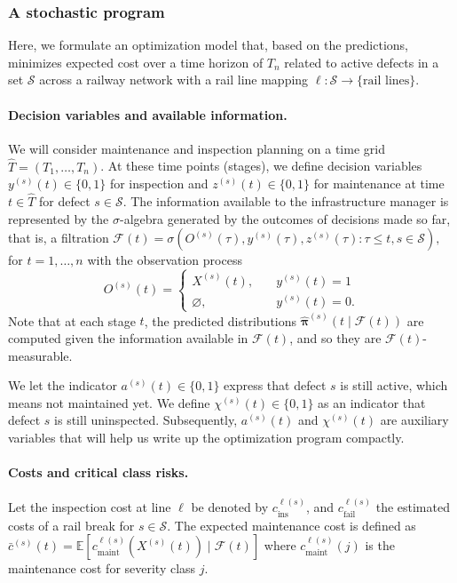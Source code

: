 \documentclass{article}
\begin{document}
\subsubsection{A stochastic program}
Here, we formulate an optimization model that, based on the predictions, minimizes expected cost over a time horizon of $T_n$ related to active defects in a set $\mathcal{S}$ across a railway network with a rail line mapping $\ell:\mathcal{S}\to\{\text{rail lines}\}$.


\paragraph{Decision variables and available information.}
We will consider maintenance and inspection planning on a time grid $\widehat T=(T_1,\dots,T_n)$.
At these time points (stages), we define decision variables 
$y^{(s)}(t)\in\{0,1\}$ for inspection and $z^{(s)}(t)\in\{0,1\}$ for maintenance at time $t \in \widehat T$ for defect $s\in\mathcal S$.
The information available to the infrastructure manager is represented by the $\sigma$-algebra generated by the outcomes of decisions made so far, that is, a filtration
$
\mathcal F(t) = \sigma \left( O^{(s)}(\tau), y^{(s)}(\tau), z^{(s)}(\tau) : \tau \leq t, s\in\mathcal S \right), 
$
for $t = 1, \dots, n$ with the observation process 
$$
O^{(s)}(t) = \begin{cases}
X^{(s)}(t), \quad &y^{(s)}(t) = 1\\ 
\varnothing, \quad &y^{(s)}(t) = 0.
\end{cases}
$$
Note that at each stage $t$, the predicted distributions $\widehat{\bm \pi}^{(s)}(t \mid \mathcal F(t))$ are computed given the information available in $\mathcal F(t)$, and so they are $\mathcal F(t)$-measurable.

We let the indicator \(a^{(s)}(t)\in\{0,1\}\) express that defect \(s\) is still active, which means not maintained yet. We define \(\chi^{(s)}(t)\in\{0,1\}\) as an indicator that defect \(s\) is still uninspected. Subsequently, $a^{(s)}(t)$ and $\chi^{(s)}(t)$ are auxiliary variables that will help us write up the optimization program compactly.


\paragraph{Costs and critical class risks.}
Let the inspection cost at line $\ell$ be denoted by $c_{\text{ins}}^{\ell(s)}$, and $c_{\text{fail}}^{\ell(s)}$ the estimated costs of a rail break for $s \in \mathcal S$.
The expected maintenance cost is defined as 
$
\bar c^{(s)}(t) = \mathds E \left[ c_{\text{maint}}^{\ell(s)} \left(X^{(s)}(t)\right) \mid \mathcal F(t) \right]
$ where $c^{\ell(s)}_{\text{maint}}(j)$ is the maintenance cost for severity class $j$.
\end{document}

